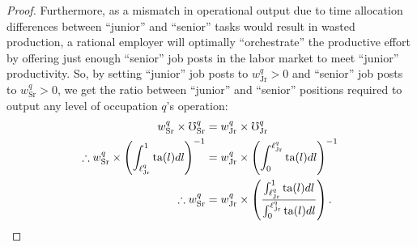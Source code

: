\documentclass[hidelinks, nonatbib]{elsarticle}
\begin{document}
\begin{theorem}
\begin{proof}
        Furthermore, as a mismatch in operational output due to time allocation differences between ``junior'' and ``senior'' tasks would result in wasted production, a rational employer will optimally ``orchestrate'' the productive effort by offering just enough ``senior'' job posts in the labor market to meet ``junior'' productivity. So, by setting ``junior'' job posts to $w_{\text{Jr}}^{q} > 0$ and ``senior'' job posts to $w_{\text{Sr}}^{q} > 0$, we get the ratio between ``junior'' and ``senior'' positions required to output any level of occupation $q$'s operation:
        \begin{align}
            w_{\text{Sr}}^{q}
            \times 
            \mho_{\text{Sr}}^{q}
            &= 
            w_{\text{Jr}}^{q}
            \times 
            \mho_{\text{Jr}}^{q}
            \\
            \therefore
            w_{\text{Sr}}^{q}
            \times 
            \left(
                \int_{\ell_{\text{Jr}}^{q}}^{1}
                \text{ta}(l)
                dl
            \right) ^ {-1}
            &= 
            w_{\text{Jr}}^{q}
            \times
            \left(
                \int_{0}^{\ell_{\text{Jr}}^{q}}
                    \text{ta}(l)
                    dl
            \right) ^ {-1}
            \\
            \therefore
            w_{\text{Sr}}^{q}
            &= 
            w_{\text{Jr}}^{q}
            \times
            \left(
                \frac{
                    \int_{\ell_{\text{Jr}}^{q}}^{1}
                    \text{ta}(l)
                    dl
                }{
                    \int_{0}^{\ell_{\text{Jr}}^{q}}
                    \text{ta}(l)
                    dl
                }
            \right)
            .
        \end{align}
        

\end{proof}
\end{theorem}
\end{document}
